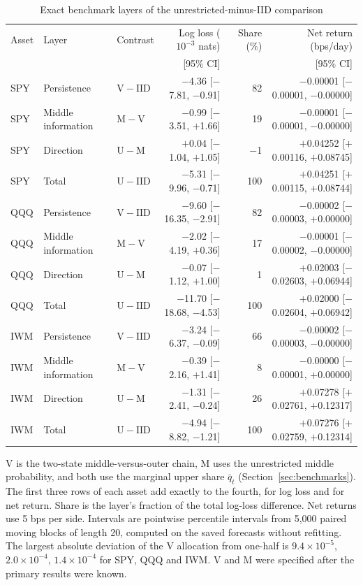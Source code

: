 \begin{table}[!htbp]\centering\small\setlength{\tabcolsep}{4pt}
\caption{Exact benchmark layers of the unrestricted-minus-IID comparison}\label{tab:layers}
\footnotesize\begin{tabular}{lllrrr}\toprule
Asset & Layer & Contrast & Log loss ($10^{-3}$ nats) & Share (\%) & Net return (bps/day)\\
 & & & [95\% CI] & & [95\% CI]\\\midrule
SPY & Persistence & $\mathrm{V}-\mathrm{IID}$ & $-$4.36 [$-$7.81, $-$0.91] & 82 & $-$0.00001 [$-$0.00001, $-$0.00000]\\
SPY & Middle information & $\mathrm{M}-\mathrm{V}$ & $-$0.99 [$-$3.51, $+$1.66] & 19 & $-$0.00001 [$-$0.00001, $-$0.00000]\\
SPY & Direction & $\mathrm{U}-\mathrm{M}$ & $+$0.04 [$-$1.04, $+$1.05] & $-$1 & $+$0.04252 [$+$0.00116, $+$0.08745]\\
SPY & Total & $\mathrm{U}-\mathrm{IID}$ & $-$5.31 [$-$9.96, $-$0.71] & 100 & $+$0.04251 [$+$0.00115, $+$0.08744]\\
\midrule
QQQ & Persistence & $\mathrm{V}-\mathrm{IID}$ & $-$9.60 [$-$16.35, $-$2.91] & 82 & $-$0.00002 [$-$0.00003, $+$0.00000]\\
QQQ & Middle information & $\mathrm{M}-\mathrm{V}$ & $-$2.02 [$-$4.19, $+$0.36] & 17 & $-$0.00001 [$-$0.00002, $-$0.00000]\\
QQQ & Direction & $\mathrm{U}-\mathrm{M}$ & $-$0.07 [$-$1.12, $+$1.00] & 1 & $+$0.02003 [$-$0.02603, $+$0.06944]\\
QQQ & Total & $\mathrm{U}-\mathrm{IID}$ & $-$11.70 [$-$18.68, $-$4.53] & 100 & $+$0.02000 [$-$0.02604, $+$0.06942]\\
\midrule
IWM & Persistence & $\mathrm{V}-\mathrm{IID}$ & $-$3.24 [$-$6.37, $-$0.09] & 66 & $-$0.00002 [$-$0.00003, $-$0.00000]\\
IWM & Middle information & $\mathrm{M}-\mathrm{V}$ & $-$0.39 [$-$2.16, $+$1.41] & 8 & $-$0.00000 [$-$0.00001, $+$0.00000]\\
IWM & Direction & $\mathrm{U}-\mathrm{M}$ & $-$1.31 [$-$2.41, $-$0.24] & 26 & $+$0.07278 [$+$0.02761, $+$0.12317]\\
IWM & Total & $\mathrm{U}-\mathrm{IID}$ & $-$4.94 [$-$8.82, $-$1.21] & 100 & $+$0.07276 [$+$0.02759, $+$0.12314]\\
\bottomrule\end{tabular}
\par\smallskip\parbox{0.98\linewidth}{\footnotesize V is the two-state middle-versus-outer chain, M uses the unrestricted middle probability, and both use the marginal upper share $\bar q_t$ (Section~\ref{sec:benchmarks}). The first three rows of each asset add exactly to the fourth, for log loss and for net return. Share is the layer's fraction of the total log-loss difference. Net returns use 5 bps per side. Intervals are pointwise percentile intervals from 5,000 paired moving blocks of length 20, computed on the saved forecasts without refitting. The largest absolute deviation of the V allocation from one-half is $9.4\times10^{-5}$, $2.0\times10^{-4}$, $1.4\times10^{-4}$ for SPY, QQQ and IWM. V and M were specified after the primary results were known.}
\end{table}
